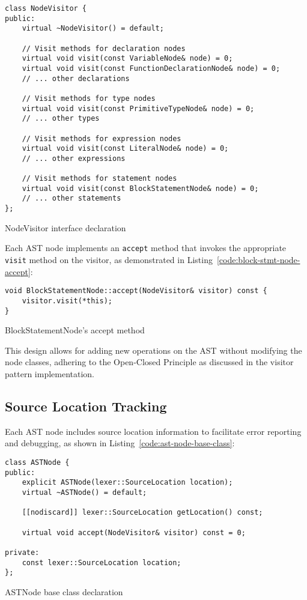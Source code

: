 \begin{listing}[!h]
\begin{verbatim}
class NodeVisitor {
public:
    virtual ~NodeVisitor() = default;
    
    // Visit methods for declaration nodes
    virtual void visit(const VariableNode& node) = 0;
    virtual void visit(const FunctionDeclarationNode& node) = 0;
    // ... other declarations
    
    // Visit methods for type nodes
    virtual void visit(const PrimitiveTypeNode& node) = 0;
    // ... other types
    
    // Visit methods for expression nodes
    virtual void visit(const LiteralNode& node) = 0;
    // ... other expressions
    
    // Visit methods for statement nodes
    virtual void visit(const BlockStatementNode& node) = 0;
    // ... other statements
};
\end{verbatim}
\caption{NodeVisitor interface declaration}
\label{code:node-visitor-interface}
\end{listing}

Each AST node implements an \texttt{accept} method that invokes the appropriate \texttt{visit} method on the visitor, as demonstrated in Listing~\ref{code:block-stmt-node-accept}:

\begin{listing}[ht!]
\begin{verbatim}
void BlockStatementNode::accept(NodeVisitor& visitor) const {
    visitor.visit(*this);
}
\end{verbatim}
\caption{BlockStatementNode's accept method}
\label{code:block-stmt-node-accept}
\end{listing}

This design allows for adding new operations on the AST without modifying the node classes, adhering to the Open-Closed Principle as discussed in the visitor pattern implementation.



\subsection{Source Location Tracking}

Each AST node includes source location information to facilitate error reporting and debugging, as shown in Listing~\ref{code:ast-node-base-class}:

\begin{listing}[h!]
\begin{verbatim}
class ASTNode {
public:
    explicit ASTNode(lexer::SourceLocation location);
    virtual ~ASTNode() = default;
    
    [[nodiscard]] lexer::SourceLocation getLocation() const;
    
    virtual void accept(NodeVisitor& visitor) const = 0;

private:
    const lexer::SourceLocation location;
};
\end{verbatim}
\caption{ASTNode base class declaration}
\label{code:ast-node-base-class}
\end{listing}

